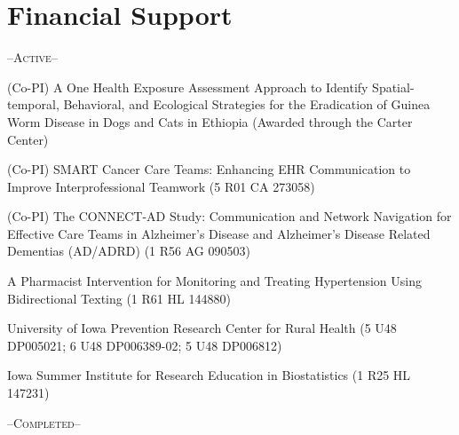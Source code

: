\documentclass[11pt]{article}
\begin{document}
\vspace{1pc}
\section{Financial Support}
\large--\textsc{Active}--\normalsize \\ \vspace{-1.5pc}
\begin{description}
\setlength\itemsep{0pc}
\item (Co-PI) A One Health Exposure Assessment Approach to Identify Spatial-temporal, Behavioral, and Ecological Strategies for the Eradication of Guinea Worm Disease in Dogs and Cats in Ethiopia (Awarded through the Carter Center)
\item (Co-PI) SMART Cancer Care Teams: Enhancing EHR Communication to Improve Interprofessional Teamwork (5 R01 CA 273058)
\item (Co-PI) The CONNECT-AD Study: Communication and Network Navigation for Effective Care Teams in Alzheimer's Disease and Alzheimer's Disease Related Dementias (AD/ADRD) (1 R56 AG 090503)
\item A Pharmacist Intervention for Monitoring and Treating Hypertension Using Bidirectional Texting (1 R61 HL 144880)
\item University of Iowa Prevention Research Center for Rural Health (5 U48 DP005021; 6 U48 DP006389-02; 5 U48 DP006812)
\item Iowa Summer Institute for Research Education in Biostatistics (1 R25 HL 147231)
\end{description}
\large--\textsc{Completed}--\normalsize \\ \vspace{-1.5pc}
\end{document}
